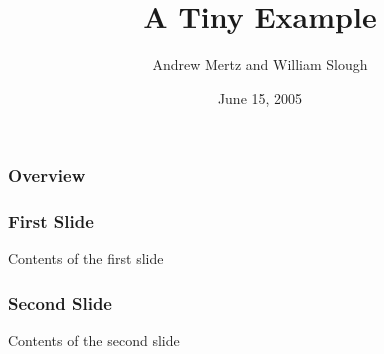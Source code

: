 \documentclass{beamer}
\title{A Tiny Example}
\author{Andrew Mertz\inst{1} and William Slough\inst{2}}
\institute{\inst{1} University of \LaTeX \and \inst{2} University of Naboo}
\date{June 15, 2005}
\begin{document}
\maketitle

\begin{frame}
    \frametitle{Overview}
    \tableofcontents[hideallsubsection]
\end{frame}

\begin{frame}
    \frametitle{First Slide}
    Contents of the first slide
\end{frame}

\begin{frame}
    \frametitle{Second Slide}
    Contents of the second slide
\end{frame}
\end{document}
